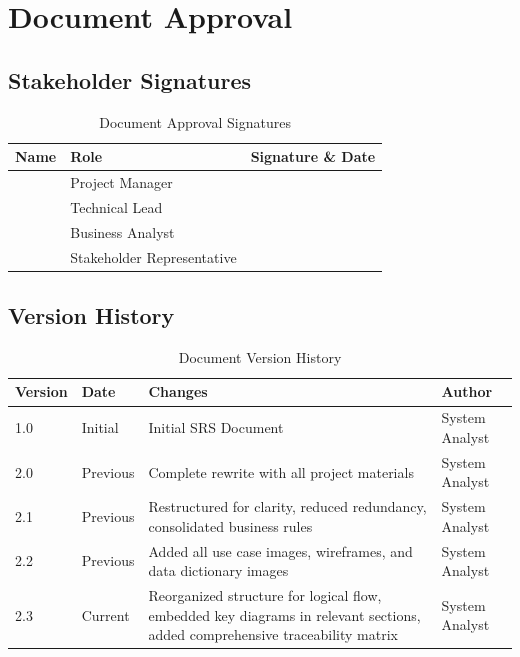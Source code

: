 \documentclass[12pt,a4paper]{article}
\begin{document}
\section{Document Approval}

\subsection{Stakeholder Signatures}
\begin{table}[H]
\centering
\begin{tabular}{|p{4cm}|p{4cm}|p{4cm}|}
\hline
\textbf{Name} & \textbf{Role} & \textbf{Signature \& Date} \\
\hline
 & Project Manager &  \\
\hline
 & Technical Lead &  \\
\hline
 & Business Analyst &  \\
\hline
 & Stakeholder Representative &  \\
\hline
\end{tabular}
\caption{Document Approval Signatures}
\end{table}

\subsection{Version History}
\begin{table}[H]
\centering
\begin{tabular}{|p{2cm}|p{3cm}|p{4cm}|p{3cm}|}
\hline
\textbf{Version} & \textbf{Date} & \textbf{Changes} & \textbf{Author} \\
\hline
1.0 & Initial & Initial SRS Document & System Analyst \\
\hline
2.0 & Previous & Complete rewrite with all project materials & System Analyst \\
\hline
2.1 & Previous & Restructured for clarity, reduced redundancy, consolidated business rules & System Analyst \\
\hline
2.2 & Previous & Added all use case images, wireframes, and data dictionary images & System Analyst \\
\hline
2.3 & Current & Reorganized structure for logical flow, embedded key diagrams in relevant sections, added comprehensive traceability matrix & System Analyst \\
\hline
\end{tabular}
\caption{Document Version History}
\end{table}
\end{document}
